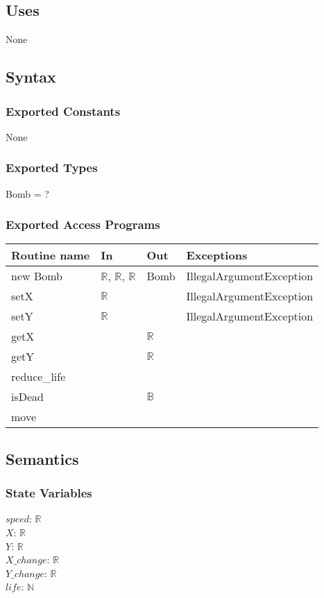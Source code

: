 \documentclass[12pt]{article}
\begin{document}
\subsection*{Uses}
None

\subsection*{Syntax}
\subsubsection*{Exported Constants}
None
\subsubsection*{Exported Types}
Bomb = ?
\subsubsection*{Exported Access Programs}
\begin{tabular}{| l | l | l | p{5cm} |}
\hline
\textbf{Routine name} & \textbf{In} & \textbf{Out} & \textbf{Exceptions}\\
\hline
new Bomb & $\mathbb{R}$, $\mathbb{R}$, $\mathbb{R}$ & Bomb & IllegalArgumentException\\
\hline
setX & $\mathbb{R}$ &  & IllegalArgumentException\\
\hline
setY & $\mathbb{R}$ &  & IllegalArgumentException\\
\hline
getX &    & $\mathbb{R}$ & \\
\hline
getY &    & $\mathbb{R}$ & \\
\hline
reduce\_life & & & \\
\hline
isDead & & $\mathbb{B}$ & \\
\hline
move & & &\\
\hline
\end{tabular}

\subsection*{Semantics}
\subsubsection*{State Variables}
$\mathit{speed}$: $\mathbb{R}$\\
$\mathit{X}$: $\mathbb{R}$\\
$\mathit{Y}$: $\mathbb{R}$\\
$\mathit{X\_change}$: $\mathbb{R}$\\
$\mathit{Y\_change}$: $\mathbb{R}$\\
$\mathit{life}$: $\mathbb{N}$
\end{document}
